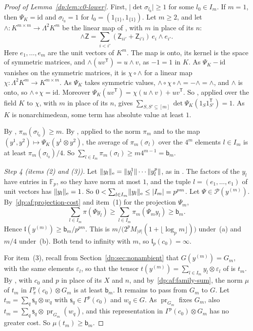 \documentclass[11pt]{amsart}
\theoremstyle{definition}
\theoremstyle{remark}
\numberwithin{equation}{section}
\newcommand{\F}{\mathbb F}
\newcommand{\id}{\mathrm{id}}
\newcommand{\abs}[1]{\lvert #1\rvert}
\newcommand{\norm}[1]{\lVert #1\rVert}
\theoremstyle{plain}
\theoremstyle{definition}
\theoremstyle{plain}
\begin{document}
\begin{proof}[Proof of Lemma~\ref{dp:lem:c0-lower}]
First, $\abs{\det\sigma_{l_0}}\ge1$ for some $l_0\in I_m$. If $m=1$, then $\Psi_K=\id$ and $\sigma_{l_0}=1$ for $l_0=(1_{\{1\}},1_{\{1\}})$. Let $m\ge2$, and let $\wedge\colon K^{m\times m}\to\Lambda^2K^m$ be the linear map of \cite[Theorem~7.20(1)]{I}, with $m$ in place of its $n$:
\[
 \wedge\mathsf Z=\sum_{i<i'}(\mathsf Z_{ii'}+\mathsf Z_{i'i})\,e_i\wedge e_{i'}.
\]
Here $e_1,\dots,e_m$ are the unit vectors of $K^m$. The map is onto, its kernel is the space of symmetric matrices, and $\wedge(uv^{\mathsf T})=u\wedge v$, as $-1=1$ in $K$. As $\Psi_K-\id$ vanishes on the symmetric matrices, it is $\chi\circ\wedge$ for a linear map $\chi\colon\Lambda^2K^m\to K^{m\times m}$. As $\Psi_K$ takes symmetric values, $\wedge\circ\chi\circ\wedge=-\wedge=\wedge$, and $\wedge$ is onto, so $\wedge\circ\chi=\id$. Moreover $\Psi_K(uv^{\mathsf T})=\chi(u\wedge v)+uv^{\mathsf T}$. So \cite[Proposition~N.12]{I}, applied over the field $K$ to $\chi$, with $m$ in place of its $n$, gives $\sum_{S,S'\subseteq[m]}\det\Psi_K(1_S1_{S'}^{\mathsf T})=1$. As $K$ is nonarchimedean, some term has absolute value at least $1$.

By \cite[Lemma~N.15(2)]{I}, $\pi_m(\sigma_{l_0})\ge m$. By \cite[Lemma~Q.6(3)]{I}, applied to the norm $\pi_m$ and to the map $(y^1,y^2)\mapsto\Psi_K(y^1\otimes y^2)$, the average of $\pi_m(\sigma_l)$ over the $4^m$ elements $l\in I_m$ is at least $\pi_m(\sigma_{l_0})/4$. So $\sum_{l\in I_m}\pi_m(\sigma_l)\ge m4^{m-1}=\mathsf b_m$.

\emph{Step 4 (items (2) and (3)).} Let $\norm{y_l}_{\rm e}=\norm{y_l^1}\cdots\norm{y_l^p}$, as in \cite[Definition~14.15]{I}. The factors of the $y_l$ have entries in $\F_p$, so they have norm at most $1$, and the tuple $l=(e_1,\dots,e_1)$ of unit vectors has $\norm{y_l}_{\rm e}=1$. So $0<\sum_{l\in I_m}\norm{y_l}_{\rm e}\le\abs{I_m}=p^{pm}$. Let $\Psi\in\mathcal P(y^{(m)})$. By~\eqref{dp:af:projection-cost} and item~(1) for the projection $\Psi_m$,
\begin{equation}\label{dp:af:family-sum}
 \sum_{l\in I_m}\pi(\Psi y_l)\ge\sum_{l\in I_m}\pi_m(\Psi_my_l)\ge\mathsf b_m.
\end{equation}
Hence $\mathfrak l(y^{(m)})\ge\mathsf b_m/p^{pm}$. This is $m/\bigl(2^pM_{\abs\vartheta}(1+\lfloor\log_pm\rfloor)\bigr)$ under~(a) and $m/4$ under~(b). Both tend to infinity with $m$, so $\mathfrak l_p(c_0)=\infty$.

For item~(3), recall from Section~\ref{dp:sec:nonambient} that $G(y^{(m)})=G_m$, with the same elements $\varepsilon_l$, so that the tensor $t(y^{(m)})=\sum_{l\in I_m}y_l\otimes\varepsilon_l$ of \cite[Definition~14.15]{I} is $t_m$. By \cite[Lemma~Q.7(1)]{I}, with $c_0$ and $p$ in place of its $X$ and $n$, and by~\eqref{dp:af:family-sum}, the norm $\mu$ of $t_m$ in $\Gamma^p_\pi(c_0)\otimes G_m$ is at least $\mathsf b_m$. It remains to pass from $G_m$ to $G$. Let $t_m=\sum_q\mathsf s_q\otimes w_q$ with $\mathsf s_q\in\Gamma^p(c_0)$ and $w_q\in G$. As $\operatorname{pr}_{G_m}$ fixes $G_m$, also $t_m=\sum_q\mathsf s_q\otimes\operatorname{pr}_{G_m}(w_q)$, and this representation in $\Gamma^p(c_0)\otimes G_m$ has no greater cost. So $\mu(t_m)\ge\mathsf b_m$.
\end{proof}
\end{document}
